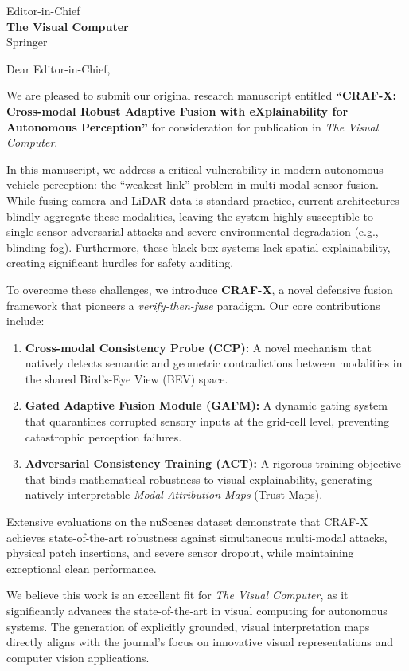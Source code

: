 \documentclass[11pt,a4paper]{letter}
\begin{document}
\begin{letter}{
Editor-in-Chief\\
\textbf{The Visual Computer}\\
Springer
}

\opening{Dear Editor-in-Chief,}

We are pleased to submit our original research manuscript entitled \textbf{``CRAF-X: Cross-modal Robust Adaptive Fusion with eXplainability for Autonomous Perception''} for consideration for publication in \textit{The Visual Computer}.

In this manuscript, we address a critical vulnerability in modern autonomous vehicle perception: the ``weakest link'' problem in multi-modal sensor fusion. While fusing camera and LiDAR data is standard practice, current architectures blindly aggregate these modalities, leaving the system highly susceptible to single-sensor adversarial attacks and severe environmental degradation (e.g., blinding fog). Furthermore, these black-box systems lack spatial explainability, creating significant hurdles for safety auditing.

To overcome these challenges, we introduce \textbf{CRAF-X}, a novel defensive fusion framework that pioneers a \textit{verify-then-fuse} paradigm. Our core contributions include:
\begin{enumerate}
    \item \textbf{Cross-modal Consistency Probe (CCP):} A novel mechanism that natively detects semantic and geometric contradictions between modalities in the shared Bird's-Eye View (BEV) space.
    \item \textbf{Gated Adaptive Fusion Module (GAFM):} A dynamic gating system that quarantines corrupted sensory inputs at the grid-cell level, preventing catastrophic perception failures.
    \item \textbf{Adversarial Consistency Training (ACT):} A rigorous training objective that binds mathematical robustness to visual explainability, generating natively interpretable \textit{Modal Attribution Maps} (Trust Maps).
\end{enumerate}

Extensive evaluations on the nuScenes dataset demonstrate that CRAF-X achieves state-of-the-art robustness against simultaneous multi-modal attacks, physical patch insertions, and severe sensor dropout, while maintaining exceptional clean performance.

We believe this work is an excellent fit for \textit{The Visual Computer}, as it significantly advances the state-of-the-art in visual computing for autonomous systems. The generation of explicitly grounded, visual interpretation maps directly aligns with the journal's focus on innovative visual representations and computer vision applications.


\end{letter}
\end{document}
